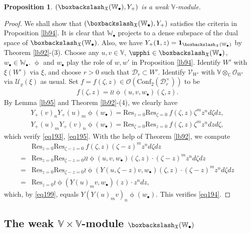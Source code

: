 \documentclass[12pt,a4paper,notitlepage]{report}
\theoremstyle{definition}
\theoremstyle{plain}
\newtheorem{pp}[df]{Proposition}
\newcommand{\fk}{\mathfrak}
\newcommand{\mc}{\mathcal}
\newcommand{\id}{\mathbf{1}}
\newcommand{\Conf}{\mathrm{Conf}}
\newcommand{\Res}{\mathrm{Res}}
\newcommand{\scr}{\mathscr}
\newcommand{\blt}{\bullet}
\newcommand{\Vbb}{\mathbb V}
\newcommand{\Wbb}{\mathbb W}
\newcommand{\Cbb}{\mathbb C}
\numberwithin{equation}{section}
\begin{document}
\begin{pp}
$(\boxbackslash_{\fk X}(\Wbb_\blt),Y_+)$ is a weak $\Vbb$-module.
\end{pp}


\begin{proof}
We shall show that $(\boxbackslash_{\fk X}(\Wbb_\blt),Y_+)$ satisfies the criteria in Proposition \ref{lb94}. It is clear  that $\Wbb_\blt$ projects to a dense subspace of the dual space of $\boxbackslash_{\fk X}(\Wbb_\blt)$. Also, we have $Y_+(\id,z)=\id_{\boxbackslash_{\fk X}(\Wbb_\blt)}$ by Theorem \ref{lb92}-(3). Choose any $u,v\in\Vbb$, $\upphi\in\boxbackslash_{\fk X}(\Wbb_\blt)$, $w_\blt\in\Wbb_\blt$. $\upphi$ and $w_\blt$ play the role of $w,w'$ in Proposition \ref{lb94}. Identify $W'$ with $\xi(W')$ via $\xi$, and choose $r>0$ such that $\mc D_r\subset W'$. Identify $\scr V_{W'}$ with $\Vbb\otimes_\Cbb\scr O_{W'}$ via $\mc U_\varrho(\xi)$ as usual. Set $f=f(\zeta,z)\in\scr O(\Conf_2(\mc D_r^\times))$ to be
\begin{align*}
f(\zeta,z)=\wr\wr\upphi(u,v,w_\blt)(\zeta,z).
\end{align*}
By Lemma \ref{lb95} and Theorem \ref{lb92}-(4), we clearly have
\begin{gather*}
Y_+(v)_nY_+(u)_m\upphi(w_\blt)=\Res_{z=0}\Res_{\zeta=0}~f(\zeta,z)\zeta^m z^nd\zeta dz,\\
Y_+(u)_mY_+(v)_n\upphi(w_\blt)=\Res_{\zeta=0}\Res_{z=0}~f(\zeta,z)\zeta^mz^ndz d\zeta,
\end{gather*}
which verify \eqref{eq193}, \eqref{eq195}. With the help of Theorem \ref{lb92}, we compute
\begin{align*}
&\Res_{z=0}\Res_{\zeta-z=0}~f(\zeta,z)(\zeta-z)^mz^nd\zeta dz\\
=&\Res_{z=0}\Res_{\zeta-z=0}\wr\wr\upphi(u,v,w_\blt)(\zeta,z)\cdot (\zeta-z)^m z^nd\zeta dz\\
=&\Res_{z=0}\Res_{\zeta-z=0}\wr\upphi(Y(u,\zeta-z)v,w_\blt)(\zeta,z)\cdot(\zeta-z)^m z^nd\zeta dz\\
=&\Res_{z=0}\wr\upphi(Y(u)_mv,w_\blt)(z)\cdot z^ndz,
\end{align*}
which, by \eqref{eq199}, equals $Y(Y(u)_mv)_n\upphi(w_\blt)$. This verifies \eqref{eq194}.
\end{proof}



\subsection*{The weak $\Vbb\times\Vbb$-module $\boxbackslash_{\fk X}(\Wbb_\blt)$}
\end{document}
